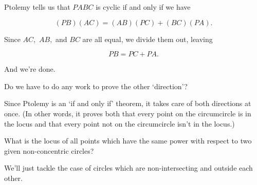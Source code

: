 
Ptolemy tells us that $PABC$ is cyclic if and only if we have

\[ (PB)(AC) = (AB)(PC) + (BC)(PA). \]


Since $AC,$ $AB,$ and $BC$ are all equal, we divide them out, leaving

$$ PB = PC + PA. $$

And we're done.

Do we have to do any work to prove the other `direction'?







Since Ptolemy is an `if and only if' theorem, it takes care of both directions at once. (In other words, it proves both that every point on the circumcircle is in the locus and that every point not on the circumcircle isn't in the locus.)

\vspace{10pt}
\begin{example}
    What is the locus of all points which have the same power with respect to two given non-concentric circles?    
\end{example}
We'll just tackle the case of circles which are non-intersecting and outside each other.

